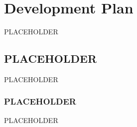 \chapter{Development Plan}\label{ch:plan}

PLACEHOLDER

\section{PLACEHOLDER}

PLACEHOLDER

\subsection{PLACEHOLDER}

PLACEHOLDER

